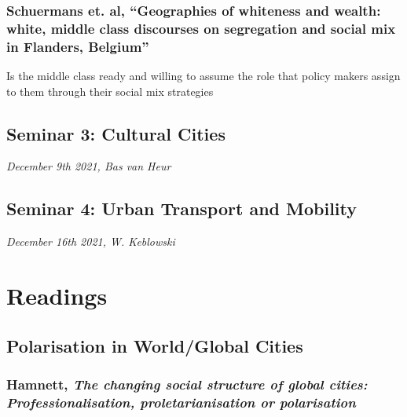 \documentclass{article}
\begin{document}
\subsubsection{Schuermans et. al, ``Geographies of whiteness and wealth: white, middle class discourses on segregation and social mix in Flanders, Belgium''}
\begin{outline}
	\1 Is the middle class ready and willing to assume the role that policy makers assign to them through their social mix strategies
\end{outline}


\subsection{Seminar 3: Cultural Cities}
\textit{December 9th 2021, Bas van Heur}


\subsection{Seminar 4: Urban Transport and Mobility}
\textit{December 16th 2021, W. Keblowski}



\section{Readings}

\subsection{Polarisation in World/Global Cities}

\subsubsection{Hamnett, \textit{The changing social structure of global cities: Professionalisation, proletarianisation or polarisation}}
\end{document}
